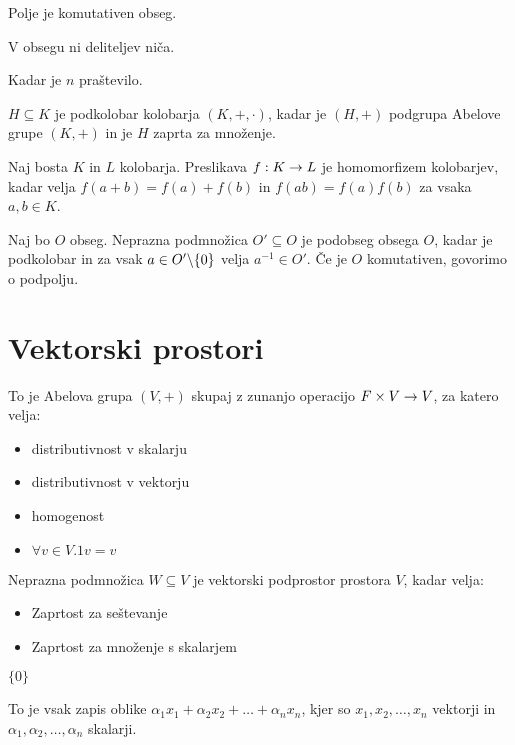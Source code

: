 Polje je komutativen obseg.

V obsegu ni deliteljev niča.


Kadar je $n$ praštevilo.


$H \subseteq K$ je podkolobar kolobarja $(K, +, \cdot)$, kadar je $(H,+)$ podgrupa Abelove grupe $(K, +)$ in je $H$ zaprta za množenje.


Naj bosta $K$ in $L$ kolobarja. Preslikava $f: K \to L$ je homomorfizem kolobarjev, kadar velja $f(a+b) = f(a)+f(b)$ in $f(ab) = f(a)f(b)$ za vsaka $a, b \in K$.


Naj bo $O$ obseg. Neprazna podmnožica $O' \subseteq O$ je podobseg obsega $O$, kadar je podkolobar in za vsak $a \in O' \backslash \{0\}$ velja $a^{-1} \in O'$. Če je $O$ komutativen, govorimo o podpolju.

\section{Vektorski prostori}


To je Abelova grupa $(V,+)$ skupaj z zunanjo operacijo $F\times V \to V$, za katero velja:
\begin{itemize}
	\item distributivnost v skalarju
	\item distributivnost v vektorju
	\item homogenost
	\item $\forall v \in V. 1v = v$
\end{itemize}


Neprazna podmnožica $W \subseteq V$ je vektorski podprostor prostora $V$, kadar velja:
\begin{itemize}
	\item Zaprtost za seštevanje
	\item Zaprtost za množenje s skalarjem
\end{itemize}


$\{0\}$


To je vsak zapis oblike $\alpha_1 x_1 + \alpha_2 x_2 + \ldots + \alpha_n x_n$, kjer so $x_1, x_2, \ldots, x_n$ vektorji in $\alpha_1, \alpha_2, \ldots, \alpha_n$ skalarji.